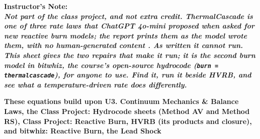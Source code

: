 \documentclass[11pt,addpoints]{exam}
\begin{document}
\noindent
\bf{Instructor's Note:}\normalfont\\

\noindent
\it{Not part of the class project, and not extra credit. ThermalCascade is one of three rate laws that ChatGPT 4o-mini proposed when asked for new reactive burn models; the report prints them as the model wrote them, with no human-generated content \cite{kittell2025sand}. As written it cannot run. This sheet gives the two repairs that make it run; it is the second burn model in bitwhiz, the course's open-source hydrocode (\texttt{burn = thermalcascade}), for anyone to use. Find it, run it beside HVRB, and see what a temperature-driven rate does differently.}\normalfont\vspace{1.5em}

\textbf{These equations build upon U3. Continuum Mechanics {\&} Balance Laws, the Class Project: Hydrocode sheets (Method AV and Method RS), Class Project: Reactive Burn, HVRB (its products and closure), and bitwhiz: Reactive Burn, the Lead Shock}\vspace{1em}
\end{document}
